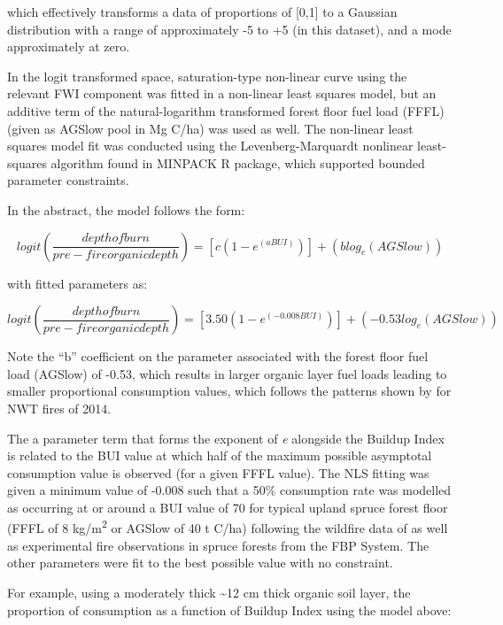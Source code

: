 \documentclass[, manuscript]{copernicus}
\begin{document}
which effectively transforms a data of proportions of {[}0,1{]} to a
Gaussian distribution with a range of approximately -5 to +5 (in this
dataset), and a mode approximately at zero.

In the logit transformed space, saturation-type non-linear curve using
the relevant FWI component was fitted in a non-linear least squares
model, but an additive term of the natural-logarithm transformed forest
floor fuel load (FFFL) (given as AGSlow pool in Mg C/ha) was used as
well. The non-linear least squares model fit was conducted using the
Levenberg-Marquardt nonlinear least-squares algorithm found in MINPACK
\citep{elzhovMinpacklmInterfaceLevenbergMarquardt2023} R package, which
supported bounded parameter constraints.

In the abstract, the model follows the form:

\begin{equation}
logit \left( \frac{depth of burn}{pre-fire organic depth}\right) = [c (1 - e^{(a  BUI)})] + (b log_{e}(AGSlow))
\end{equation}

with fitted parameters as:

\begin{equation}
logit \left( \frac{depth of burn}{pre-fire organic depth}\right) = [3.50 (1 - e^{(-0.008 BUI)})] + (-0.53 log_{e}(AGSlow))
\end{equation}

Note the ``b'' coefficient on the parameter associated with the forest
floor fuel load (AGSlow) of -0.53, which results in larger organic layer
fuel loads leading to smaller proportional consumption values, which
follows the patterns shown by \citet{walkerCrossscaleControlsCarbon2018}
for NWT fires of 2014.

The a parameter term that forms the exponent of \emph{e} alongside the
Buildup Index is related to the BUI value at which half of the maximum
possible asymptotal consumption value is observed (for a given FFFL
value). The NLS fitting was given a minimum value of -0.008 such that a
50\% consumption rate was modelled as occurring at or around a BUI value
of 70 for typical upland spruce forest floor (FFFL of 8
kg/m\textsuperscript{2} or AGSlow of 40 t C/ha) following the wildfire
data of \citet{degroot2009} as well as experimental fire observations in
spruce forests from the FBP System. The other parameters were fit to the
best possible value with no constraint.

For example, using a moderately thick \textasciitilde12 cm thick organic
soil layer, the proportion of consumption as a function of Buildup Index
using the model above:
\end{document}
